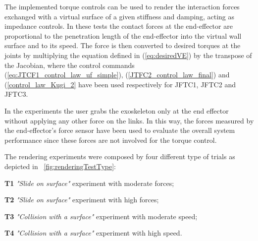 The implemented torque controls can be used to render the interaction forces exchanged with a virtual surface of a given stiffness and damping, acting as impedance controls. In these tests the contact forces at the end-effector are proportional to the penetration length of the end-effector into the virtual wall surface and to its speed. The force is then converted to desired torques at the joints by multiplying the equation defined in (\ref{eq:desiredVE}) by the transpose of the Jacobian, where the control commands (\ref{eq:JTCF1_control_law_uf_simple}), (\ref{JTFC2_control_law_final}) and (\ref{control_law_Kugi_2} have been used respectively for JFTC1, JFTC2 and JFTC3.
\par In the experiments the user grabs the exoskeleton only at the end effector without applying any other force on the links. In this way, the forces measured by the end-effector's force sensor have been used to evaluate the overall system performance since these forces are not involved for the torque control.
\par The rendering experiments were composed by four different type of trials as depicted in \figurename \ \ref{fig:renderingTestType}:
\begin{IEEEdescription}
\item[{\bf T1 }] \hspace{0.5 cm} {\em  "Slide on surface"} experiment with moderate forces;
\item[{\bf T2 }] \hspace{0.5 cm} {\em "Slide on surface" } experiment with high forces;
\item[{\bf T3 }] \hspace{0.5 cm} {\em "Collision with a surface"}  experiment with moderate speed;
\item[{\bf T4 }] \hspace{0.5 cm} {\em "Collision with a surface" } experiment with high speed.
\end{IEEEdescription}

